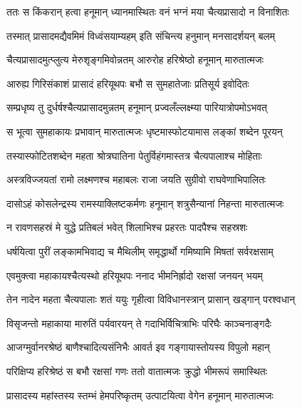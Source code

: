 
\twolineshloka
{ततः स किंकरान् हत्वा हनूमान् ध्यानमास्थितः}
{वनं भग्नं मया चैत्यप्रासादो न विनाशितः} %

\twolineshloka
{तस्मात् प्रासादमद्यैवमिमं विध्वंसयाम्यहम्}
{इति संचिन्त्य हनुमान् मनसादर्शयन् बलम्} %

\twolineshloka
{चैत्यप्रासादमुत्प्लुत्य मेरुशृङ्गमिवोन्नतम्}
{आरुरोह हरिश्रेष्ठो हनूमान् मारुतात्मजः} %

\twolineshloka
{आरुह्य गिरिसंकाशं प्रासादं हरियूथपः}
{बभौ स सुमहातेजाः प्रतिसूर्य इवोदितः} %

\twolineshloka
{सम्प्रधृष्य तु दुर्धर्षश्चैत्यप्रासादमुन्नतम्}
{हनूमान् प्रज्वलँल्लक्ष्म्या पारियात्रोपमोऽभवत्} %

\twolineshloka
{स भूत्वा सुमहाकायः प्रभावान् मारुतात्मजः}
{धृष्टमास्फोटयामास लङ्कां शब्देन पूरयन्} %

\twolineshloka
{तस्यास्फोटितशब्देन महता श्रोत्रघातिना}
{पेतुर्विहंगमास्तत्र चैत्यपालाश्च मोहिताः} %

\twolineshloka
{अस्त्रविज्जयतां रामो लक्ष्मणश्च महाबलः}
{राजा जयति सुग्रीवो राघवेणाभिपालितः} %

\twolineshloka
{दासोऽहं कोसलेन्द्रस्य रामस्याक्लिष्टकर्मणः}
{हनूमान् शत्रुसैन्यानां निहन्ता मारुतात्मजः} %

\twolineshloka
{न रावणसहस्रं मे युद्धे प्रतिबलं भवेत्}
{शिलाभिश्च प्रहरतः पादपैश्च सहस्रशः} %

\twolineshloka
{धर्षयित्वा पुरीं लङ्कामभिवाद्य च मैथिलीम्}
{समृद्धार्थो गमिष्यामि मिषतां सर्वरक्षसाम्} %

\twolineshloka
{एवमुक्त्वा महाकायश्चैत्यस्थो हरियूथपः}
{ननाद भीमनिर्ह्रादो रक्षसां जनयन् भयम्} %

\twolineshloka
{तेन नादेन महता चैत्यपालाः शतं ययुः}
{गृहीत्वा विविधानस्त्रान् प्रासान् खड्गान् परश्वधान्} %

\twolineshloka
{विसृजन्तो महाकाया मारुतिं पर्यवारयन्}
{ते गदाभिर्विचित्राभिः परिघैः काञ्चनाङ्गदैः} %

\twolineshloka
{आजग्मुर्वानरश्रेष्ठं बाणैश्चादित्यसंनिभैः}
{आवर्त इव गङ्गायास्तोयस्य विपुलो महान्} %

\twolineshloka
{परिक्षिप्य हरिश्रेष्ठं स बभौ रक्षसां गणः}
{ततो वातात्मजः क्रुद्धो भीमरूपं समास्थितः} %

\twolineshloka
{प्रासादस्य महांस्तस्य स्तम्भं हेमपरिष्कृतम्}
{उत्पाटयित्वा वेगेन हनूमान् मारुतात्मजः} %


